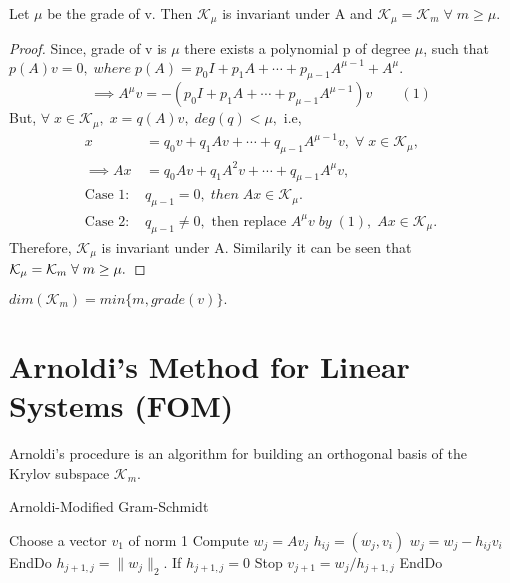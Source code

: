 \documentclass[10pt,a4paper]{article}
\begin{document}
\begin{theorem}
Let $\mu$ be the grade of v. Then $\mathcal{K}_\mu$ is invariant under A and $\mathcal{K}_\mu = \mathcal{K}_m\;\forall\;m\ge\mu.$
\end{theorem}

\begin{proof}
Since, grade of v is $\mu$ there exists a polynomial p of degree $\mu$, such that $p(A)v=0,\;where\;p(A) = p_0I+p_1A+\cdots+p_{\mu-1}A^{\mu-1}+A^\mu.$
$$\implies A^\mu v = -(p_0I+p_1A+\cdots+p_{\mu-1}A^{\mu-1})v\qquad(1)$$
But, $\forall\;x\in\mathcal{K}_\mu,\;x=q(A)v,\;deg(q)<\mu,$ i.e,
\begin{align*}
x &= q_0v+q_1Av+\cdots+q_{\mu-1}A^{\mu-1}v,\;\forall\;x\in\mathcal{K}_\mu, \\
\implies Ax &= q_0Av+q_1A^2v+\cdots+q_{\mu-1}A^\mu v, \\
\text{Case 1: }& q_{\mu-1} = 0,\;then\;Ax\in\mathcal{K}_\mu. \\
\text{Case 2: }& q_{\mu-1} \neq 0,\text{ then replace }A^\mu v\;by\;(1),\;Ax\in\mathcal{K}_\mu.
\end{align*}
Therefore, $\mathcal{K}_\mu$ is invariant under A. Similarily it can be seen that $\mathcal{K}_\mu = \mathcal{K}_m \\
\;\forall\;m\ge\mu.$
\end{proof}

\begin{corollary}
$dim(\mathcal{K}_m) = min\{m,grade(v)\}.$
\end{corollary}

\section{Arnoldi's Method for Linear Systems (FOM)}

Arnoldi's procedure is an algorithm for building an orthogonal basis of the Krylov subspace $\mathcal{K}_m$.

\begin{algorithm}
\caption{Arnoldi-Modified Gram-Schmidt}
\begin{algorithmic}[1]
\State Choose a vector $v_1$ of norm 1
	\State Compute $w_j = Av_j$
		\State $h_{ij} = (w_j,v_i)$
		\State $w_j = w_j - h_{ij}v_i$
	\EndFor
	\State EndDo
	\State $h_{j+1,j} = \|w_j\|_2$. If $h_{j+1,j}=0$ Stop
	\State $v_{j+1}=w_j/h_{j+1,j}$
\EndFor
\State EndDo
\end{algorithmic}
\end{algorithm}
\end{document}
